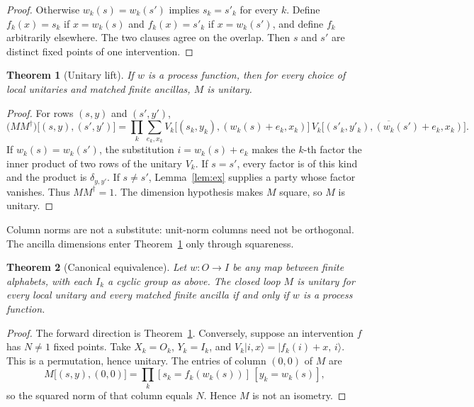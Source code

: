 \documentclass[11pt]{article}
\newtheorem{theorem}{Theorem}
\theoremstyle{definition}
\begin{document}
\begin{proof}
Otherwise \(w_k(s)=w_k(s')\) implies \(s_k=s'_k\) for every \(k\). Define \(f_k(x)=s_k\) if \(x=w_k(s)\) and \(f_k(x)=s'_k\) if \(x=w_k(s')\), and define \(f_k\) arbitrarily elsewhere. The two clauses agree on the overlap. Then \(s\) and \(s'\) are distinct fixed points of one intervention.
\end{proof}

\begin{theorem}[Unitary lift]
\label{thm:lift}
If \(w\) is a process function, then for every choice of local unitaries and matched finite ancillas, \(M\) is unitary.
\end{theorem}

\begin{proof}
For rows \((s,y)\) and \((s',y')\),
\begin{equation}
\label{eq:gram}
\bigl(MM^{\dagger}\bigr)\bigl[(s,y),(s',y')\bigr]
=\prod_k\sum_{e_k,x_k}
V_k\bigl[(s_k,y_k),(w_k(s)+e_k,x_k)\bigr]\,
\overline{V_k\bigl[(s'_k,y'_k),(w_k(s')+e_k,x_k)\bigr]}.
\end{equation}
If \(w_k(s)=w_k(s')\), the substitution \(i=w_k(s)+e_k\) makes the \(k\)-th factor the inner product of two rows of the unitary \(V_k\). If \(s=s'\), every factor is of this kind and the product is \(\delta_{y,y'}\). If \(s\neq s'\), Lemma~\ref{lem:ex} supplies a party whose factor vanishes. Thus \(MM^{\dagger}=1\). The dimension hypothesis makes \(M\) square, so \(M\) is unitary.
\end{proof}

Column norms are not a substitute: unit-norm columns need not be orthogonal. The ancilla dimensions enter Theorem~\ref{thm:lift} only through squareness.

\begin{theorem}[Canonical equivalence]
\label{thm:iff}
Let \(w:O\to I\) be any map between finite alphabets, with each \(I_k\) a cyclic group as above. The closed loop \(M\) is unitary for every local unitary and every matched finite ancilla if and only if \(w\) is a process function.
\end{theorem}

\begin{proof}
The forward direction is Theorem~\ref{thm:lift}. Conversely, suppose an intervention \(f\) has \(N\neq 1\) fixed points. Take \(X_k=O_k\), \(Y_k=I_k\), and \(V_k\lvert i,x\rangle=\lvert f_k(i)+x,\,i\rangle\). This is a permutation, hence unitary. The entries of column \((0,0)\) of \(M\) are
\[
M\bigl[(s,y),(0,0)\bigr]
=\prod_k [s_k=f_k(w_k(s))]\,[y_k=w_k(s)],
\]
so the squared norm of that column equals \(N\). Hence \(M\) is not an isometry.
\end{proof}
\end{document}
